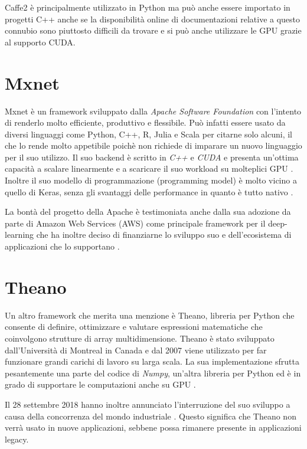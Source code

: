 Caffe2 è principalmente utilizzato in Python ma può anche essere importato in progetti C++ anche se la disponibilità online di documentazioni relative a questo connubio sono piuttosto difficili da trovare \cite{caffe_c++} e si può anche utilizzare le GPU grazie al supporto CUDA.

\section{Mxnet}
Mxnet è un framework sviluppato dalla \textit{Apache Software Foundation} con l'intento di renderlo molto efficiente, produttivo e flessibile. Può infatti essere usato da diversi linguaggi come Python, C++, R, Julia e Scala per citarne solo alcuni, il che lo rende molto appetibile poichè non richiede di imparare un nuovo linguaggio per il suo utilizzo. Il suo backend è scritto in \emph{C++} e \emph{CUDA} e presenta un'ottima capacità a scalare linearmente e a scaricare il suo workload su molteplici GPU \cite{maruti:mxnet}. Inoltre il suo modello di programmazione (programming model) è molto vicino a quello di Keras, senza gli svantaggi delle performance in quanto è tutto nativo \cite{quora:mxnet}.

La bontà del progetto della Apache è testimoniata anche dalla sua adozione da parte di Amazon Web Services (AWS) come principale framework per il deep-learning che ha inoltre deciso di finanziarne lo sviluppo suo e dell'ecosistema di applicazioni che lo supportano \cite{aws-mxnet}. 
\section{Theano}
Un altro framework che merita una menzione è Theano, libreria per Python che consente di definire, ottimizzare e valutare espressioni matematiche che coinvolgono strutture di array multidimensione. 
Theano è stato sviluppato dall'Università di Montreal in Canada e dal 2007 viene utilizzato per far funzionare grandi carichi di lavoro su larga scala. La sua implementazione sfrutta pesantemente una parte del codice di \emph{Numpy}, un'altra libreria per Python ed è in grado di supportare le computazioni anche su GPU \cite{2016arXiv160502688short}.

Il 28 settembre 2018 hanno inoltre annunciato l'interruzione del suo sviluppo a causa della concorrenza del mondo industriale \cite{lamblin}. Questo significa che Theano non verrà usato in nuove applicazioni, sebbene possa rimanere presente in applicazioni legacy.
